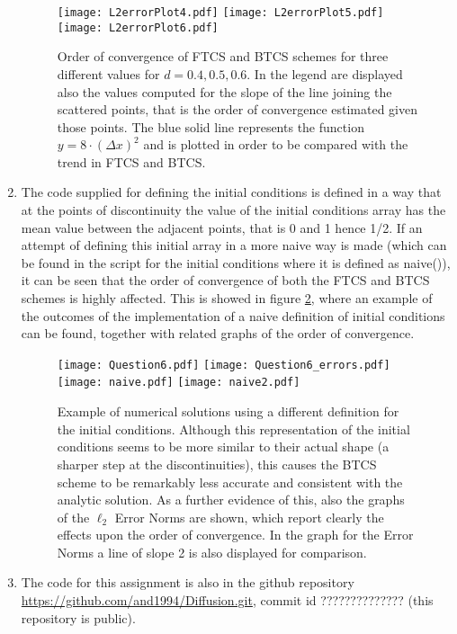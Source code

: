 \documentclass[12pt]{article}
\begin{document}
\begin{enumerate}
\begin{figure}[!tbh]
\centering
\texttt{[image: L2errorPlot4.pdf]}
\texttt{[image: L2errorPlot5.pdf]}
\texttt{[image: L2errorPlot6.pdf]}

\caption{Order of convergence of FTCS and BTCS schemes for three different values for $d=0.4, 0.5, 0.6$. In the legend are displayed also the values computed for the slope of the line joining the scattered points, that is the order of convergence estimated given those points. The blue solid line represents the function $y=8\cdot(\Delta x)^2$ and is plotted in order to be compared with the trend in FTCS and BTCS.
\label{fig:Q5}}
\end{figure}

\item The code supplied for defining the initial conditions is defined in a way that at the points of discontinuity the value of the initial conditions array has the mean value between the adjacent points, that is 0 and 1 hence 1/2. If an attempt of defining this initial array in a more naive way is made (which can be found in the script for the initial conditions where it is defined as naive()), it can be seen that the order of convergence of both the FTCS and BTCS schemes is highly affected. This is showed in figure \ref{fig:Q6}, where an example of the outcomes of the implementation of a naive definition of initial conditions can be found, together with related graphs of the order of convergence.

\begin{figure}[!tbh]
\centering
\texttt{[image: Question6.pdf]}
\texttt{[image: Question6\_errors.pdf]}
\texttt{[image: naive.pdf]}
\texttt{[image: naive2.pdf]}

\caption{Example of numerical solutions using a different definition for the initial conditions. Although this representation of the initial conditions seems to be more similar to their actual shape (a sharper step at the discontinuities), this causes the BTCS scheme to be remarkably less accurate and consistent with the analytic solution. As a further evidence of this, also the graphs of the $\ell_2$ Error Norms are shown, which report clearly the effects upon the order of convergence. In the graph for the Error Norms a line of slope 2 is also displayed for comparison.}
\label{fig:Q6}
\end{figure}

\item The code for this assignment is also in the github repository\\
\url{https://github.com/and1994/Diffusion.git}, commit id ?????????????? (this repository is public).


\end{enumerate}
\end{document}
